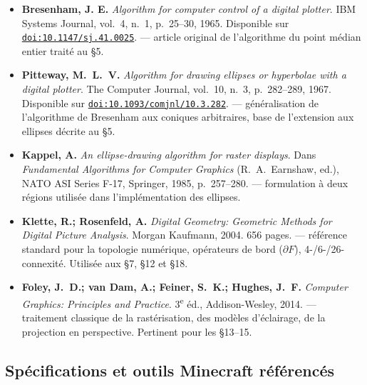\documentclass[12pt,a4paper]{scrartcl}
\newcommand{\biblink}[2]{\href{#1}{\nolinkurl{#2}}}
\begin{document}
\begin{itemize}[leftmargin=1.4em,itemsep=0.3em,topsep=0.3em]
  \item \textbf{Bresenham, J. E.} \emph{Algorithm for computer control of a digital plotter}.
        IBM Systems Journal, vol.~4, n.~1, p.~25--30, 1965.
        Disponible sur \biblink{https://doi.org/10.1147/sj.41.0025}{doi:10.1147/sj.41.0025}.
        --- article original de l'algorithme du point médian entier traité au §5.

  \item \textbf{Pitteway, M.~L.~V.} \emph{Algorithm for drawing ellipses or hyperbolae
        with a digital plotter}. The Computer Journal, vol.~10, n.~3, p.~282--289, 1967.
        Disponible sur \biblink{https://doi.org/10.1093/comjnl/10.3.282}{doi:10.1093/comjnl/10.3.282}.
        --- généralisation de l'algorithme de Bresenham aux coniques arbitraires, base de l'extension aux ellipses décrite au §5.

  \item \textbf{Kappel, A.} \emph{An ellipse-drawing algorithm for raster displays}.
        Dans \emph{Fundamental Algorithms for Computer Graphics} (R.~A.~Earnshaw, ed.),
        NATO ASI Series F-17, Springer, 1985, p.~257--280.
        --- formulation à deux régions utilisée dans l'implémentation des ellipses.

  \item \textbf{Klette, R.; Rosenfeld, A.} \emph{Digital Geometry: Geometric Methods
        for Digital Picture Analysis}. Morgan Kaufmann, 2004. 656 pages.
        --- référence standard pour la topologie numérique, opérateurs de bord ($\partial F$), 4-/6-/26-connexité. Utilisée aux §7, §12 et §18.

  \item \textbf{Foley, J.~D.; van Dam, A.; Feiner, S.~K.; Hughes, J.~F.}
        \emph{Computer Graphics: Principles and Practice}. 3\textsuperscript{e} éd., Addison-Wesley, 2014.
        --- traitement classique de la rastérisation, des modèles d'éclairage, de la projection en perspective. Pertinent pour les §13--15.
\end{itemize}

\subsection*{Spécifications et outils Minecraft référencés}
\end{document}
